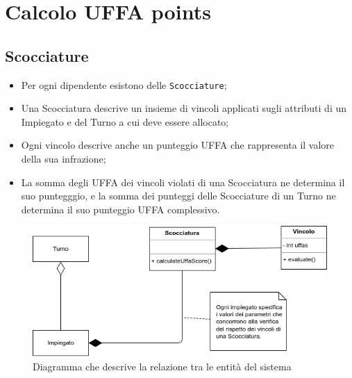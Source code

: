 \documentclass[compress]{beamer}
\begin{document}
\section{Calcolo UFFA points}
\subsection{Scocciature}

\begin{frame}{\subsecname}
    \begin{itemize}
        \item Per ogni dipendente esistono delle \texttt{Scocciature};
        \item Una Scocciatura descrive un insieme di vincoli applicati sugli attributi
        di un Impiegato e del Turno a cui deve essere allocato;
        \item Ogni vincolo descrive anche un punteggio UFFA che rappresenta il valore
        della sua infrazione;
        \item La somma degli UFFA dei vincoli violati di una Scocciatura ne determina il
        suo puntegggio, e la somma dei punteggi delle Scocciature di un Turno ne
        determina il suo punteggio UFFA complessivo.
    \end{itemize}
\end{frame}
\begin{frame}{\subsecname}
    \begin{figure}
        \centering
        \includegraphics[width=\textwidth]{./figs/examples.png}
        \caption{Diagramma che descrive la relazione tra le entità del sistema}      
    \end{figure}
\end{frame}
\end{document}
